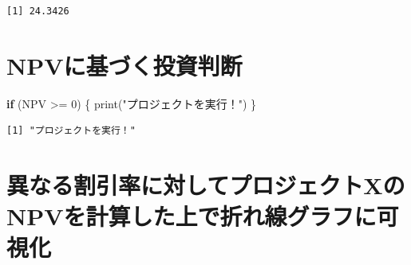 \documentclass[
  letterpaper,
  DIV=11,
  numbers=noendperiod]{scrreprt}
\newenvironment{Shaded}{\begin{snugshade}}{\end{snugshade}}
\newcommand{\ControlFlowTok}[1]{\textcolor[rgb]{0.00,0.23,0.31}{\textbf{#1}}}
\newcommand{\DecValTok}[1]{\textcolor[rgb]{0.68,0.00,0.00}{#1}}
\newcommand{\FunctionTok}[1]{\textcolor[rgb]{0.28,0.35,0.67}{#1}}
\newcommand{\NormalTok}[1]{\textcolor[rgb]{0.00,0.23,0.31}{#1}}
\newcommand{\SpecialCharTok}[1]{\textcolor[rgb]{0.37,0.37,0.37}{#1}}
\newcommand{\StringTok}[1]{\textcolor[rgb]{0.13,0.47,0.30}{#1}}
\begin{document}
\begin{verbatim}
[1] 24.3426
\end{verbatim}

\section{NPVに基づく投資判断}\label{npvux306bux57faux3065ux304fux6295ux8cc7ux5224ux65ad}

\begin{Shaded}
\begin{Highlighting}[]
\ControlFlowTok{if}\NormalTok{ (NPV }\SpecialCharTok{\textgreater{}=} \DecValTok{0}\NormalTok{) \{}
  \FunctionTok{print}\NormalTok{(}\StringTok{"プロジェクトを実行！"}\NormalTok{)}
\NormalTok{\}}
\end{Highlighting}
\end{Shaded}

\begin{verbatim}
[1] "プロジェクトを実行！"
\end{verbatim}

\section{異なる割引率に対してプロジェクトXのNPVを計算した上で折れ線グラフに可視化}\label{ux7570ux306aux308bux5272ux5f15ux7387ux306bux5bfeux3057ux3066ux30d7ux30edux30b8ux30a7ux30afux30c8xux306enpvux3092ux8a08ux7b97ux3057ux305fux4e0aux3067ux6298ux308cux7ddaux30b0ux30e9ux30d5ux306bux53efux8996ux5316}
\end{document}
